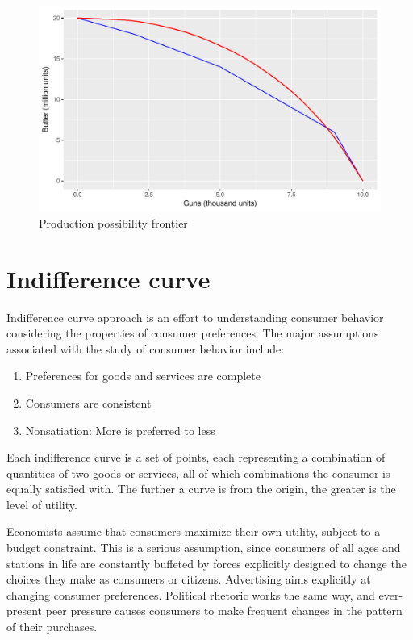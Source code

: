 \documentclass[11pt,]{book}
\providecommand{\tightlist}{%
  \setlength{\itemsep}{0pt}\setlength{\parskip}{0pt}}
\theoremstyle{definition}
\theoremstyle{definition}
\theoremstyle{definition}
\theoremstyle{remark}
\begin{document}
\begin{figure}

{\centering \includegraphics[width=0.9\linewidth]{Farm_Management_and_Economics_files/figure-latex/ppfrontier-1} 

}

\caption{Production possibility frontier}\label{fig:ppfrontier}
\end{figure}

\section{Indifference curve}\label{indifference-curve}

Indifference curve approach is an effort to understanding consumer
behavior considering the properties of consumer preferences. The major
assumptions associated with the study of consumer behavior include:

\begin{enumerate}
\def\labelenumi{\arabic{enumi}.}
\tightlist
\item
  Preferences for goods and services are complete
\item
  Consumers are consistent
\item
  Nonsatiation: More is preferred to less
\end{enumerate}

Each indifference curve is a set of points, each representing a
combination of quantities of two goods or services, all of which
combinations the consumer is equally satisfied with. The further a curve
is from the origin, the greater is the level of utility.

Economists assume that consumers maximize their own utility, subject to
a budget constraint. This is a serious assumption, since consumers of
all ages and stations in life are constantly buffeted by forces
explicitly designed to change the choices they make as consumers or
citizens. Advertising aims explicitly at changing consumer preferences.
Political rhetoric works the same way, and ever-present peer pressure
causes consumers to make frequent changes in the pattern of their
purchases.
\end{document}
